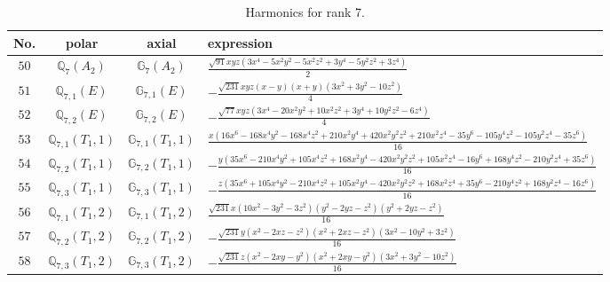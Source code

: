 \documentclass[fleqn,8pt,landscape]{jsarticle}
\begin{document}
\begin{table}[ht!]
\begin{center}
\caption{Harmonics for rank 7.}
\renewcommand{\arraystretch}{1.3}
\begin{tabular}{cccl} \hline \hline
No. & polar & axial & expression \\ \hline
$ 50 $ & $ \mathbb{Q}_{7}(A_{2}) $ & $ \mathbb{G}_{7}(A_{2}) $ & $ \frac{\sqrt{91} x y z \left(3 x^{4} - 5 x^{2} y^{2} - 5 x^{2} z^{2} + 3 y^{4} - 5 y^{2} z^{2} + 3 z^{4}\right)}{2} $ \\
$ 51 $ & $ \mathbb{Q}_{7,1}(E) $ & $ \mathbb{G}_{7,1}(E) $ & $ - \frac{\sqrt{231} x y z \left(x - y\right) \left(x + y\right) \left(3 x^{2} + 3 y^{2} - 10 z^{2}\right)}{4} $ \\
$ 52 $ & $ \mathbb{Q}_{7,2}(E) $ & $ \mathbb{G}_{7,2}(E) $ & $ - \frac{\sqrt{77} x y z \left(3 x^{4} - 20 x^{2} y^{2} + 10 x^{2} z^{2} + 3 y^{4} + 10 y^{2} z^{2} - 6 z^{4}\right)}{4} $ \\
$ 53 $ & $ \mathbb{Q}_{7,1}(T_{1},1) $ & $ \mathbb{G}_{7,1}(T_{1},1) $ & $ \frac{x \left(16 x^{6} - 168 x^{4} y^{2} - 168 x^{4} z^{2} + 210 x^{2} y^{4} + 420 x^{2} y^{2} z^{2} + 210 x^{2} z^{4} - 35 y^{6} - 105 y^{4} z^{2} - 105 y^{2} z^{4} - 35 z^{6}\right)}{16} $ \\
$ 54 $ & $ \mathbb{Q}_{7,2}(T_{1},1) $ & $ \mathbb{G}_{7,2}(T_{1},1) $ & $ - \frac{y \left(35 x^{6} - 210 x^{4} y^{2} + 105 x^{4} z^{2} + 168 x^{2} y^{4} - 420 x^{2} y^{2} z^{2} + 105 x^{2} z^{4} - 16 y^{6} + 168 y^{4} z^{2} - 210 y^{2} z^{4} + 35 z^{6}\right)}{16} $ \\
$ 55 $ & $ \mathbb{Q}_{7,3}(T_{1},1) $ & $ \mathbb{G}_{7,3}(T_{1},1) $ & $ - \frac{z \left(35 x^{6} + 105 x^{4} y^{2} - 210 x^{4} z^{2} + 105 x^{2} y^{4} - 420 x^{2} y^{2} z^{2} + 168 x^{2} z^{4} + 35 y^{6} - 210 y^{4} z^{2} + 168 y^{2} z^{4} - 16 z^{6}\right)}{16} $ \\
$ 56 $ & $ \mathbb{Q}_{7,1}(T_{1},2) $ & $ \mathbb{G}_{7,1}(T_{1},2) $ & $ \frac{\sqrt{231} x \left(10 x^{2} - 3 y^{2} - 3 z^{2}\right) \left(y^{2} - 2 y z - z^{2}\right) \left(y^{2} + 2 y z - z^{2}\right)}{16} $ \\
$ 57 $ & $ \mathbb{Q}_{7,2}(T_{1},2) $ & $ \mathbb{G}_{7,2}(T_{1},2) $ & $ - \frac{\sqrt{231} y \left(x^{2} - 2 x z - z^{2}\right) \left(x^{2} + 2 x z - z^{2}\right) \left(3 x^{2} - 10 y^{2} + 3 z^{2}\right)}{16} $ \\
$ 58 $ & $ \mathbb{Q}_{7,3}(T_{1},2) $ & $ \mathbb{G}_{7,3}(T_{1},2) $ & $ - \frac{\sqrt{231} z \left(x^{2} - 2 x y - y^{2}\right) \left(x^{2} + 2 x y - y^{2}\right) \left(3 x^{2} + 3 y^{2} - 10 z^{2}\right)}{16} $ \\

\end{tabular}
\end{center}
\end{table}
\end{document}
